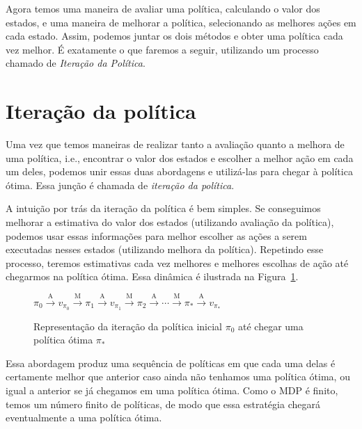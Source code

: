 \documentclass{article}
\begin{document}
        Agora temos uma maneira de avaliar uma política, calculando o valor dos estados, e uma maneira de melhorar a política, selecionando as melhores ações em cada estado. Assim, podemos juntar os dois métodos e obter uma política cada vez melhor. É exatamente o que faremos a seguir, utilizando um processo chamado de \emph{Iteração da Política}.
    
    \section{Iteração da política}
    
        Uma vez que temos maneiras de realizar tanto a avaliação quanto a melhora de uma política, i.e., encontrar o valor dos estados e escolher a melhor ação em cada um deles, podemos unir essas duas abordagens e utilizá-las para chegar à política ótima. Essa junção é chamada de \emph{iteração da política}.
        
        A intuição por trás da iteração da política é bem simples. Se conseguimos melhorar a estimativa do valor dos estados (utilizando avaliação da política), podemos usar essas informações para melhor escolher as ações a serem executadas nesses estados (utilizando melhora da política). Repetindo esse processo, teremos estimativas cada vez melhores e melhores escolhas de ação até chegarmos na política ótima. Essa dinâmica é ilustrada na Figura~\ref{fig:policy-iteration}.
        
        \begin{figure}[ht]
            \centering
            \begin{math}
                \pi_0 \xrightarrow{\ \textrm{A} \ } 
                v_{\pi_0} \xrightarrow{\ \textrm{M} \ } 
                \pi_1 \xrightarrow{\ \textrm{A} \ } 
                v_{\pi_1} \xrightarrow{\ \textrm{M} \ } 
                \pi_2 \xrightarrow{\ \textrm{A} \ } 
                \cdots \xrightarrow{\ \textrm{M} \ }
                \pi_* \xrightarrow{\ \textrm{A} \ } v_{\pi_*}
            \end{math}
            \caption{Representação da iteração da política inicial $\pi_0$ até chegar uma política ótima $\pi_*$}
            \label{fig:policy-iteration}
        \end{figure}
        
        Essa abordagem produz uma sequência de políticas em que cada uma delas é certamente melhor que anterior caso ainda não tenhamos uma política ótima, ou igual a anterior se já chegamos em uma política ótima. Como o MDP é finito, temos um número finito de políticas, de modo que essa estratégia chegará eventualmente a uma política ótima.
        
\end{document}
